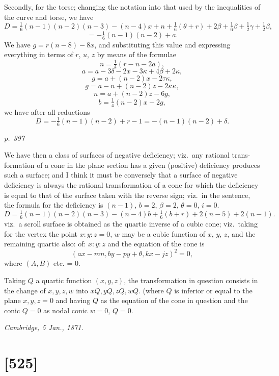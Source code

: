 \documentclass[11pt,a4paper]{book}
\begin{document}
Secondly, for the torse; changing the notation into that used by the inequalities
of the curve and torse, we have
\[
D = \tfrac{1}{6}(n - 1)(n - 2)(n - 3) - (n - 4)x + n + \tfrac{1}{6}(\theta + r) + 2\beta + \tfrac{1}{6}\beta + \tfrac{1}{2}\gamma + \tfrac{1}{2}\beta,
\]
\[
= -\tfrac{1}{6}(n - 1)(n - 2) + a.
\]
We have $g = r(n - 8) - 8x$, and substituting this value and expressing everything in
terms of $r$, $u$, $z$ by means of the formulae
\[
n = \tfrac{1}{4}(r - n - 2 a),
\]
\[
a = a - 3\delta - 2x - 3 \kappa + 4 \beta + 2 \kappa,
\]
\[
g = a + (n - 2)x - 2\tau \kappa,
\]
\[
g = a - n + (n - 2) z - 2 \kappa \kappa,
\]
\[
n = a + (n - 2) z - 6 g,
\]
\[
b = \tfrac{1}{4}(n - 2)x - 2 g,
\]
we have after all reductions
\[
D = -\tfrac{1}{6}(n - 1)(n - 2) + r - 1 = -(n - 1)(n - 2) + \delta.
\]

\clearpage

\bigskip
\textit{p.~397}
\smallskip

\noindent
We have then a class of surfaces of negative deficiency; viz.\ any rational trans-
formation of a cone in the plane section has a given (positive) deficiency produces
such a surface; and I think it must be conversely that a surface of
negative deficiency is always the rational transformation of a cone for which the
deficiency is equal to that of the surface taken with the reverse sign; viz.\ in the
sentence, the formula for the deficiency is $(n - 1)$, $b = 2$, $\beta = 2$, $\theta = 0$, $i = 0$.
\[
D = \tfrac{1}{6}(n - 1)(n - 2)(n - 3) - (n - 4)b + \tfrac{1}{6}(b + r) + 2(n - 5) + 2(n - 1).
\]
viz.\ a scroll surface is obtained as the quartic inverse of a cubic cone; viz.\ taking
for the vertex the point $x : y : z = 0$, $w$ may be a cubic function of $x$, $y$, $z$, and the
remaining quartic also: of: $x : y : z$ and the equation of the cone is
\[
(ax - mn, by - py + \theta, kx - jz)^2 = 0,
\]
where $(A, B)$ etc. = 0.

Taking $Q$ a quartic function $(x, y, z)$, the transformation in question consists in
the change of $x, y, z, w$ into $xQ, yQ, zQ, wQ$.  (where $Q$ is inferior or equal to the
plane $x, y, z = 0$ and having $Q$ as the equation of the cone in
question and the conic $Q = 0$ as nodal conic $w = 0$, $Q = 0$.

\noindent\textit{Cambridge, 5 Jan., 1871.}

\clearpage

\section{[525]}
\end{document}
